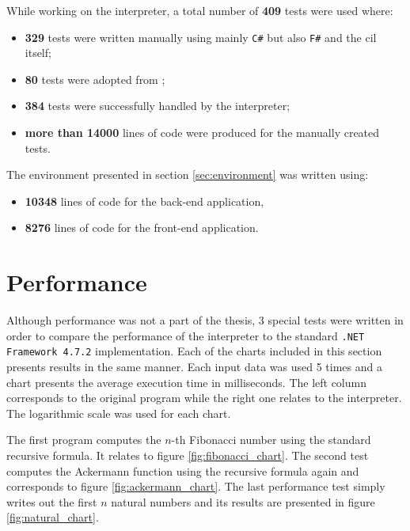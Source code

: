 \documentclass[declaration,shortabstract,english,mgr]{iithesis}
\begin{document}
While working on the interpreter, a total number of \textbf{409} tests were used where:
\begin{itemize}
	\item{\textbf{329} tests were written manually using mainly \texttt{C\#} but also \texttt{F\#} and the \acrshort{cil} itself;}
	\item{\textbf{80} tests were adopted from \cite{tutorialspoint};}
	\item{\textbf{384} tests were successfully handled by the interpreter;}
	\item{\textbf{more than 14000} lines of code were produced for the manually created tests.}
\end{itemize}

The environment presented in section \ref{sec:environment} was written using:
\begin{itemize}
	\item{\textbf{10348} lines of code for the back-end application,}
	\item{\textbf{8276} lines of code for the front-end application.}
\end{itemize}

\section{Performance}
\label{sec:performance}

Although performance was not a part of the thesis, 3 special tests were written in order to compare the performance of the interpreter to the standard \texttt{.NET Framework 4.7.2} implementation. Each of the charts included in this section presents results in the same manner. Each input data was used 5 times and a chart presents the average execution time in milliseconds. The left column corresponds to the original program while the right one relates to the interpreter. The logarithmic scale was used for each chart.

The first program computes the $n$-th Fibonacci number using the standard recursive formula. It relates to figure \ref{fig:fibonacci_chart}. The second test computes the Ackermann function using the recursive formula again and corresponds to figure \ref{fig:ackermann_chart}. The last performance test simply writes out the first $n$ natural numbers and its results are presented in figure \ref{fig:natural_chart}.
\end{document}
